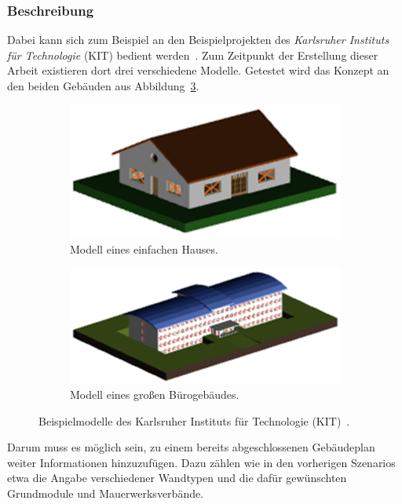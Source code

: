 \subsubsection*{Beschreibung}
Dabei kann sich zum Beispiel an den Beispielprojekten des \textit{Karlsruher Instituts für Technologie} (KIT) bedient werden~\cite{KITSAMPLEHOUSE:online}.
Zum Zeitpunkt der Erstellung dieser Arbeit existieren dort drei verschiedene Modelle.
Getestet wird das Konzept an den beiden Gebäuden aus Abbildung~\ref{fig:scenarios:Scenario3 KIT}.
\begin{figure}[htb]
  \begin{subfigure}[b]{0.5\columnwidth}
    \includegraphics[width=\columnwidth]{fig/KIT-Haus.png}
    \caption{Modell eines einfachen Hauses.}\label{fig:scenarios:scenario3 kit haus}
  \end{subfigure}
  \hfill
  \begin{subfigure}[b]{0.5\columnwidth}
    \includegraphics[width=\columnwidth]{fig/KIT-Buerogebaeude.png}
    \caption{Modell eines großen Bürogebäudes.}\label{fig:scenarios:scenario3 kit office}
  \end{subfigure}
  \caption{Beispielmodelle des Karlsruher Instituts für Technologie (KIT)~\cite{KITSAMPLEHOUSE:online}.}\label{fig:scenarios:Scenario3 KIT}
\end{figure}

Darum muss es möglich sein, zu einem bereits abgeschlossenen Gebäudeplan weiter Informationen hinzuzufügen.
Dazu zählen wie in den vorherigen Szenarios etwa die Angabe verschiedener Wandtypen und die dafür gewünschten Grundmodule und Mauerwerksverbände.

